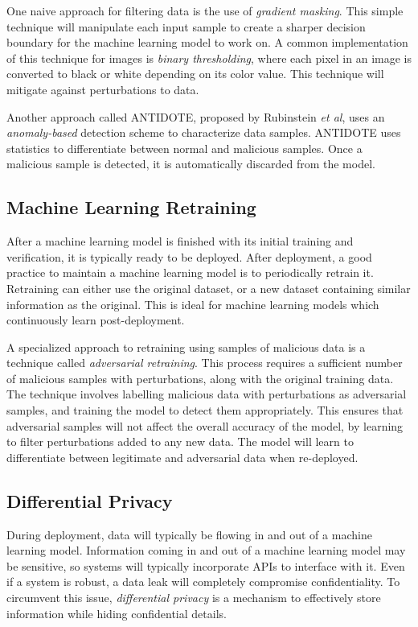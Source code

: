 \documentclass[11pt,conference]{IEEEtran}
\begin{document}
One naive approach for filtering data is the use of \emph{gradient masking}.
This simple technique will manipulate each input sample to create a sharper
decision boundary for the machine learning model to work on. A common
implementation of this technique for images is \emph{binary thresholding},
where each pixel in an image is converted to black or white depending on its
color value. This technique will mitigate against perturbations to data.

Another approach called ANTIDOTE, proposed by Rubinstein \emph{et al}, uses an \emph{anomaly-based}
detection scheme to characterize data samples. ANTIDOTE uses statistics to
differentiate between normal and malicious samples. Once a malicious sample is
detected, it is automatically discarded from the model.

\subsection{Machine Learning Retraining}
After a machine learning model is finished with its initial training and
verification, it is typically ready to be deployed. After deployment, a good
practice to maintain a machine learning model is to periodically retrain it.
Retraining can either use the original dataset, or a new dataset containing
similar information as the original. This is ideal for machine learning models
which continuously learn post-deployment.

A specialized approach to retraining using samples of malicious data is a technique called
\emph{adversarial retraining}. This process requires  
a sufficient number of malicious samples with perturbations, along with the
original training data. The technique
involves labelling malicious data with perturbations as adversarial samples, and training
the model to detect them appropriately. This ensures that adversarial samples will not affect
the overall accuracy of the model, by learning to filter perturbations added to
any new data. The model will learn to differentiate between legitimate and
adversarial data when re-deployed.

\subsection{Differential Privacy}
During deployment, data will typically be flowing in and out of a machine
learning model. Information coming in and out of a machine learning model may be sensitive, so
systems will typically incorporate APIs to interface with it. Even if a system
is robust, a data leak will completely compromise confidentiality. To
circumvent this issue, \emph{differential privacy} is a mechanism to
effectively store
information while hiding confidential details.
\end{document}
